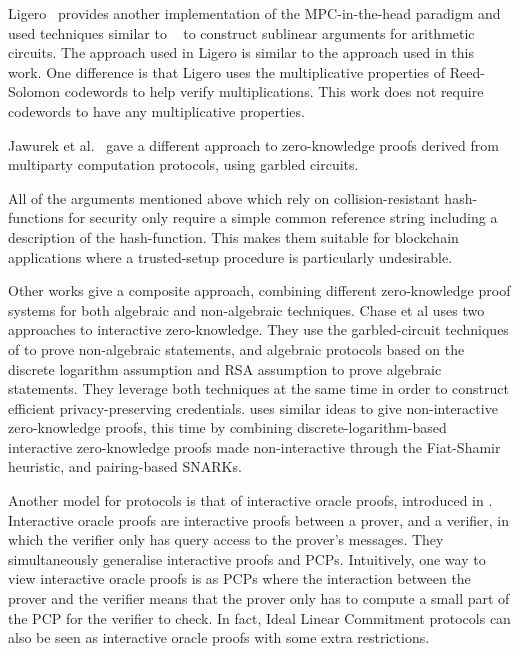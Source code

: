 Ligero~\cite{CCS:AHIV17} provides another implementation of the MPC-in-the-head paradigm and used techniques similar to ~\cite{BootleCGGHJ17} to construct sublinear arguments for arithmetic circuits. The approach used in Ligero is similar to the approach used in this work. One difference is that Ligero uses the multiplicative properties of Reed-Solomon codewords to help verify multiplications. This work does not require codewords to have any multiplicative properties.

Jawurek et al.~\cite{JawurekKO13} gave a different approach to zero-knowledge proofs derived from multiparty computation protocols, using garbled circuits.

All of the arguments mentioned above which rely on collision-resistant hash-functions for security only require a simple common reference string including a description of the hash-function. This makes them suitable for blockchain applications where a trusted-setup procedure is particularly undesirable.

Other works give a composite approach, combining different zero-knowledge proof systems for both algebraic and non-algebraic techniques. Chase et al \cite{ChaseGM16} uses two approaches to interactive zero-knowledge. They use the garbled-circuit techniques of \cite{JawurekKO13} to prove non-algebraic statements, and algebraic protocols based on the discrete logarithm assumption and RSA assumption to prove algebraic statements. They leverage both techniques at the same time in order to construct efficient privacy-preserving credentials. \cite{AgrawalGM18} uses similar ideas to give non-interactive zero-knowledge proofs, this time by combining discrete-logarithm-based interactive zero-knowledge proofs made non-interactive through the Fiat-Shamir heuristic, and pairing-based SNARKs.

Another model for protocols is that of interactive oracle proofs, introduced in \cite{Ben-SassonCS16}. Interactive oracle proofs are interactive proofs between a prover, and a verifier, in which the verifier only has query access to the prover's messages. They simultaneously generalise interactive proofs and PCPs. Intuitively, one way to view interactive oracle proofs is as PCPs where the interaction between the prover and the verifier means that the prover only has to compute a small part of the PCP for the verifier to check. In fact, Ideal Linear Commitment protocols can also be seen as interactive oracle proofs with some extra restrictions.


